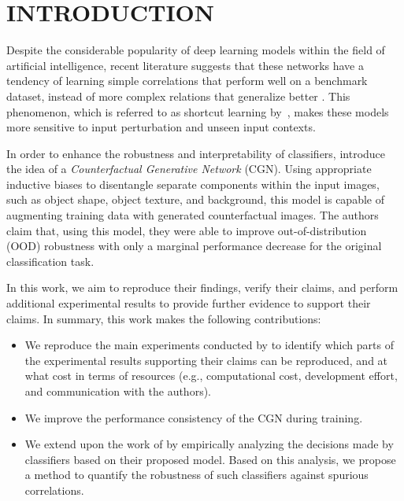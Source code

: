 \section{INTRODUCTION}

Despite the considerable popularity of deep learning models within the field of artificial intelligence, recent literature suggests that these networks have a tendency of learning simple correlations that perform well on a benchmark dataset, instead of more complex relations that generalize better \cite{alcorn2019strike, ming2021impact, rosenfeld2018elephant}. This phenomenon, which is referred to as shortcut learning by~\citet{geirhos2020shortcut}, makes these models more sensitive to input perturbation and unseen input contexts.

In order to enhance the robustness and interpretability of classifiers, \citet{Sauer2021ICLR} introduce the idea of a \emph{Counterfactual Generative Network} (CGN).
Using appropriate inductive biases to disentangle separate components within the input images, such as object shape, object texture, and background, this model is capable of augmenting training data with generated counterfactual images.
The authors claim that, using this model, they were able to improve out-of-distribution (OOD) robustness with only a marginal performance decrease for the original classification task.

In this work, we aim to reproduce their findings, verify their claims, and perform additional experimental results to provide further evidence to support their claims. In summary, this work makes the following contributions:
\begin{itemize}
    \item We reproduce the main experiments conducted by \citet{Sauer2021ICLR} to identify which parts of the experimental results supporting their claims can be reproduced, and at what cost in terms of resources (e.g., computational cost, development effort, and communication with the authors).
    \item We improve the performance consistency of the CGN during training.
    \item We extend upon the work of \citeauthor{Sauer2021ICLR} by empirically analyzing the decisions made by classifiers based on their proposed model. Based on this analysis, we propose a method to quantify the robustness of such classifiers against spurious correlations.
\end{itemize}

